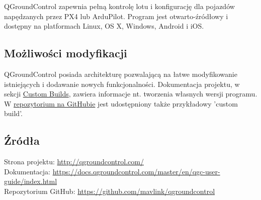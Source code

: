 \documentclass[../Research.tex]{subfiles}
\begin{document}
QGroundControl zapewnia pełną kontrolę lotu i konfigurację dla pojazdów napędzanych przez PX4 lub ArduPilot. Program jest otwarto-źródłowy i dostępny na platformach Linux, OS X, Windows, Android i iOS.

\subsection{Możliwości modyfikacji}
QGroundControl posiada architekturę pozwalającą na łatwe modyfikowanie istniejących i dodawanie nowych funkcjonalności. Dokumentacja projektu, w sekcji \href{https://docs.qgroundcontrol.com/master/en/qgc-dev-guide/custom_build/custom_build.html}{Custom Builds}, zawiera informacje nt. tworzenia własnych wersji programu.
W \href{https://github.com/mavlink/qgroundcontrol/tree/master/custom-example}{repozytorium na GitHubie} jest udostępniony także przykładowy 'custom build'.

\subsection{Źródła}
Strona projektu: \url{http://qgroundcontrol.com/}\\
Dokumentacja: \url{https://docs.qgroundcontrol.com/master/en/qgc-user-guide/index.html}\\
Repozytorium GitHub: \url{https://github.com/mavlink/qgroundcontrol}
\end{document}
